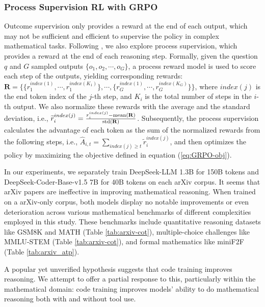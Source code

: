 \begin{itemize}[topsep=0pt]
\subsubsection{Process Supervision RL with GRPO} Outcome supervision only provides a reward at the end of each output, which may not be sufficient and efficient to supervise the policy in complex mathematical tasks. Following \cite{wang2023math}, we also explore process supervision, which provides a reward at the end of each reasoning step. Formally, given the question $q$ and $G$  sampled outputs $\{o_1, o_2, \cdots, o_G\}$, a process reward model is used to score each step of the outputs, yielding corresponding rewards: $\mathbf{R} = \{ \{r_1^{index(1)},\cdots,r_1^{index(K_1)}\}, \cdots,  \{r_G^{index(1)},\cdots,r_G^{index(K_G)}\} \}$, where $index(j)$ is the end token index of the $j$-th step, and $K_i$ is the total number of steps in the $i$-th output. We also normalize these rewards with the average and the standard deviation, i.e., $\widetilde{r}_i^{index(j)} = \frac{r_i^{index(j)} - {\rm mean(\mathbf{R})}}{{\rm std(\mathbf{R})}}$.
Subsequently, the process supervision calculates the advantage of each token as the sum of the normalized rewards from the following steps, i.e., $\hat{A}_{i, t} = \sum_{index(j) \ge t} \widetilde{r}_i^{index(j)}$,
and then optimizes the policy by maximizing the objective defined in equation (\ref{eq:GRPO-obj}).

In our experiments, we separately train DeepSeek-LLM 1.3B for 150B tokens and DeepSeek-Coder-Base-v1.5 7B for 40B tokens on each arXiv corpus. It seems that arXiv papers are ineffective in improving mathematical reasoning. When trained on a arXiv-only corpus, both models display no notable improvements or even deterioration across various mathematical benchmarks of different complexities employed in this study. These benchmarks include quantitative reasoning datasets like GSM8K and MATH (Table \ref{tab:arxiv-cot}), multiple-choice challenges like MMLU-STEM (Table \ref{tab:arxiv-cot}), and formal mathematics like miniF2F (Table \ref{tab:arxiv_atp}).

A popular yet unverified hypothesis suggests that code training improves reasoning. We attempt to offer a partial response to this, particularly within the mathematical domain: code training improves models' ability to do mathematical reasoning both with and without tool use.


\end{itemize}
